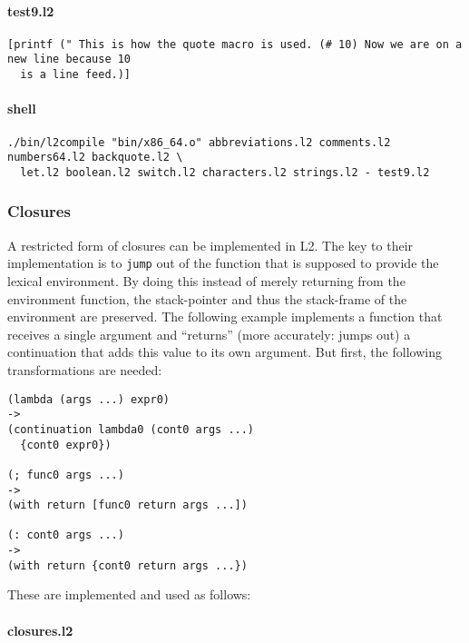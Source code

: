 \documentclass[]{article}
\let\oldparagraph\paragraph
\renewcommand{\paragraph}[1]{\oldparagraph{#1}\mbox{}}
\begin{document}
\paragraph{test9.l2}\label{test9.l2}

\begin{verbatim}
[printf (" This is how the quote macro is used. (# 10) Now we are on a new line because 10
  is a line feed.)]
\end{verbatim}

\paragraph{shell}\label{shell-8}

\begin{verbatim}
./bin/l2compile "bin/x86_64.o" abbreviations.l2 comments.l2 numbers64.l2 backquote.l2 \
  let.l2 boolean.l2 switch.l2 characters.l2 strings.l2 - test9.l2
\end{verbatim}

\hypertarget{closures}{\subsubsection{Closures}\label{closures}}

A restricted form of closures can be implemented in L2. The key to their
implementation is to \texttt{jump} out of the function that is supposed
to provide the lexical environment. By doing this instead of merely
returning from the environment function, the stack-pointer and thus the
stack-frame of the environment are preserved. The following example
implements a function that receives a single argument and ``returns''
(more accurately: jumps out) a continuation that adds this value to its
own argument. But first, the following transformations are needed:

\begin{verbatim}
(lambda (args ...) expr0)
->
(continuation lambda0 (cont0 args ...)
  {cont0 expr0})

(; func0 args ...)
->
(with return [func0 return args ...])

(: cont0 args ...)
->
(with return {cont0 return args ...})
\end{verbatim}

These are implemented and used as follows:

\paragraph{closures.l2}\label{closures.l2}
\end{document}
